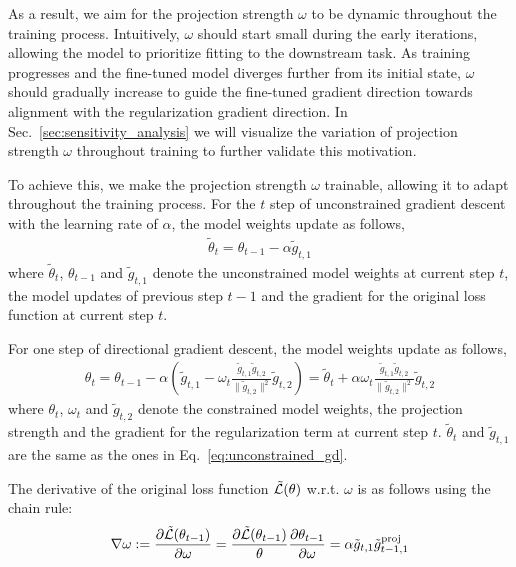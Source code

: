As a result, we aim for the projection strength $\omega$ to be dynamic throughout the training process. Intuitively, $\omega$ should start small during the early iterations, allowing the model to prioritize fitting to the downstream task. As training progresses and the fine-tuned model diverges further from its initial state, $\omega$ should gradually increase to guide the fine-tuned gradient direction towards alignment with the regularization gradient direction. {In Sec.~\ref{sec:sensitivity_analysis} we will visualize the variation of projection strength $\omega$ throughout training to further validate this motivation.} 

To achieve this, we make the projection strength $\omega$ trainable, allowing it to adapt throughout the training process.
For the $t$ step of unconstrained gradient descent with the learning rate of $\alpha$, the model weights update as follows,
\begin{align}
    \label{eq:unconstrained_gd}
    \tilde{\theta}_{t} = \theta_{t-1} - \alpha \tilde{g}_{t,1}
\end{align}
where $\tilde{\theta}_{t}$, $\theta_{t-1}$ and $\tilde{g}_{t,1}$ denote the unconstrained model weights at current step $t$, the model updates of previous step $t-1$ and the gradient for the original loss function at current step $t$.

For one step of directional gradient descent, the model weights update as follows,
\begin{align}
    \label{eq:directional_gd}
    \theta_{t} = \theta_{t-1} - \alpha (\tilde{g}_{t,1} - \omega_t \frac{\tilde{g}_{t, 1} \tilde{g}_{t, 2}}{\|\tilde{g}_{t, 2}\|^2} \tilde{g}_{t, 2})
    = \tilde{\theta}_{t} + \alpha \omega_t \frac{\tilde{g}_{t, 1} \tilde{g}_{t, 2}}{\|\tilde{g}_{t, 2}\|^2} \tilde{g}_{t, 2}
\end{align}
where $\theta_{t}$, $\omega_t$ and $\tilde{g}_{t, 2}$ denote the constrained model weights, the projection strength and the gradient for the regularization term at current step $t$. $\tilde{\theta}_{t}$ and $\tilde{g}_{t,1}$ are the same as the ones in Eq.~\ref{eq:unconstrained_gd}.

The derivative of the original loss function $\Tilde{\mathcal{L}}(\theta)$ w.r.t. $\omega$ is as follows using the chain rule:
\begin{align}
    \label{eq:omega_lr}
    \nabla\omega := \frac{\partial \Tilde{\mathcal{L}}(\theta_{t-1})}{\partial \omega}
    = \frac{\partial \Tilde{\mathcal{L}}(\theta_{t-1})}{\theta} \frac{\partial \theta_{t-1}}{\partial \omega}
    = \alpha \tilde{g}_{t,1} \tilde{g}_{t-1, 1}^{\text{proj}}
\end{align}


